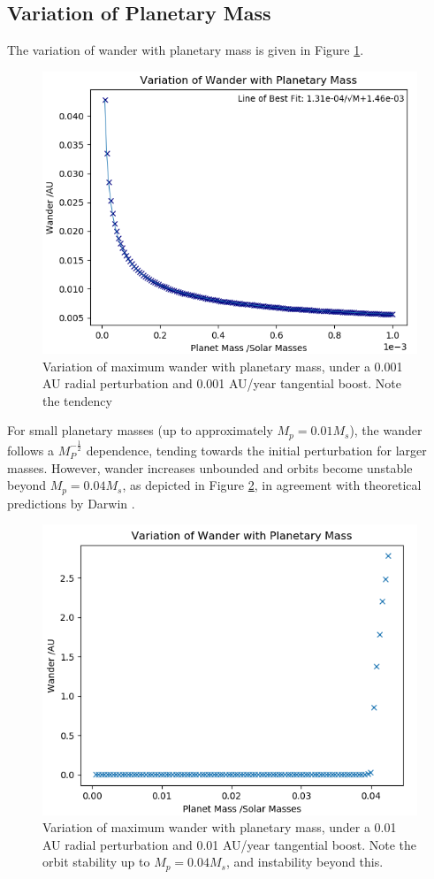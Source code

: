 \documentclass[11pt, a4paper,twocolumn]{article} %
\begin{document}
\subsection{Variation of Planetary Mass} \label{planet}
The variation of wander with planetary mass is given in Figure \ref{fig:planetmass}.

\begin{figure}[ht]
	\centering
	\includegraphics[width=0.8\linewidth]{Figures/wanderwithplanetmass_q7}
	\caption{Variation of maximum wander with planetary mass, under a 0.001 AU radial perturbation and 0.001 AU/year tangential boost. Note the tendency }
	\label{fig:planetmass}
\end{figure}

For small planetary masses (up to approximately $ M_{p} = 0.01 M_{s}$), the wander follows a $ M_{P}^{-\frac{1}{2}}$ dependence, tending towards the initial perturbation for larger masses. However, wander increases unbounded and orbits become unstable beyond $ M_{p} = 0.04 M_{s}$, as depicted in Figure \ref{fig:planetmass2}, in agreement with theoretical predictions by Darwin \cite{Darwin1897}.

\begin{figure}[ht]
	\centering
	\includegraphics[width=0.8\linewidth]{Figures/wanderwithplanetmass_p6}
	\caption{Variation of maximum wander with planetary mass, under a 0.01 AU radial perturbation and 0.01 AU/year tangential boost. Note the orbit stability up to $ M_{p} = 0.04 M_{s}$, and instability beyond this.}
	\label{fig:planetmass2}
\end{figure}
\end{document}
